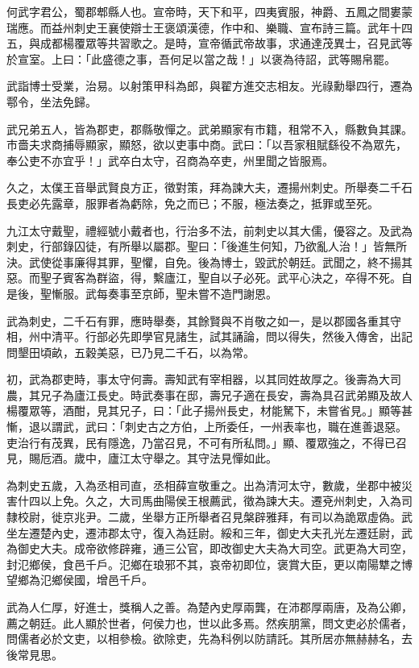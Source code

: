 
\begin{pinyinscope}
何武字君公，蜀郡郫縣人也。宣帝時，天下和平，四夷賓服，神爵、五鳳之間婁蒙瑞應。而益州刺史王襄使辯士王褒頌漢德，作中和、樂職、宣布詩三篇。武年十四五，與成都楊覆眾等共習歌之。是時，宣帝循武帝故事，求通達茂異士，召見武等於宣室。上曰：「此盛德之事，吾何足以當之哉！」以褒為待詔，武等賜帛罷。

武詣博士受業，治易。以射策甲科為郎，與翟方進交志相友。光祿勳舉四行，遷為鄠令，坐法免歸。

武兄弟五人，皆為郡吏，郡縣敬憚之。武弟顯家有巿籍，租常不入，縣數負其課。巿嗇夫求商捕辱顯家，顯怒，欲以吏事中商。武曰：「以吾家租賦繇役不為眾先，奉公吏不亦宜乎！」武卒白太守，召商為卒吏，州里聞之皆服焉。

久之，太僕王音舉武賢良方正，徵對策，拜為諫大夫，遷揚州刺史。所舉奏二千石長吏必先露章，服罪者為虧除，免之而已；不服，極法奏之，抵罪或至死。

九江太守戴聖，禮經號小戴者也，行治多不法，前刺史以其大儒，優容之。及武為刺史，行部錄囚徒，有所舉以屬郡。聖曰：「後進生何知，乃欲亂人治！」皆無所決。武使從事廉得其罪，聖懼，自免。後為博士，毀武於朝廷。武聞之，終不揚其惡。而聖子賓客為群盜，得，繫廬江，聖自以子必死。武平心決之，卒得不死。自是後，聖慚服。武每奏事至京師，聖未嘗不造門謝恩。

武為刺史，二千石有罪，應時舉奏，其餘賢與不肖敬之如一，是以郡國各重其守相，州中清平。行部必先即學官見諸生，試其誦論，問以得失，然後入傳舍，出記問墾田頃畝，五穀美惡，已乃見二千石，以為常。

初，武為郡吏時，事太守何壽。壽知武有宰相器，以其同姓故厚之。後壽為大司農，其兄子為廬江長史。時武奏事在邸，壽兄子適在長安，壽為具召武弟顯及故人楊覆眾等，酒酣，見其兄子，曰：「此子揚州長史，材能駑下，未嘗省見。」顯等甚慚，退以謂武，武曰：「刺史古之方伯，上所委任，一州表率也，職在進善退惡。吏治行有茂異，民有隱逸，乃當召見，不可有所私問。」顯、覆眾強之，不得已召見，賜卮酒。歲中，廬江太守舉之。其守法見憚如此。

為刺史五歲，入為丞相司直，丞相薛宣敬重之。出為清河太守，數歲，坐郡中被災害什四以上免。久之，大司馬曲陽侯王根薦武，徵為諫大夫。遷兗州刺史，入為司隸校尉，徙京兆尹。二歲，坐舉方正所舉者召見槃辟雅拜，有司以為詭眾虛偽。武坐左遷楚內史，遷沛郡太守，復入為廷尉。綏和三年，御史大夫孔光左遷廷尉，武為御史大夫。成帝欲修辟雍，通三公官，即改御史大夫為大司空。武更為大司空，封氾鄉侯，食邑千戶。氾鄉在琅邪不其，哀帝初即位，褒賞大臣，更以南陽犨之博望鄉為氾鄉侯國，增邑千戶。

武為人仁厚，好進士，獎稱人之善。為楚內史厚兩龔，在沛郡厚兩唐，及為公卿，薦之朝廷。此人顯於世者，何侯力也，世以此多焉。然疾朋黨，問文吏必於儒者，問儒者必於文吏，以相參檢。欲除吏，先為科例以防請託。其所居亦無赫赫名，去後常見思。


\end{pinyinscope}

